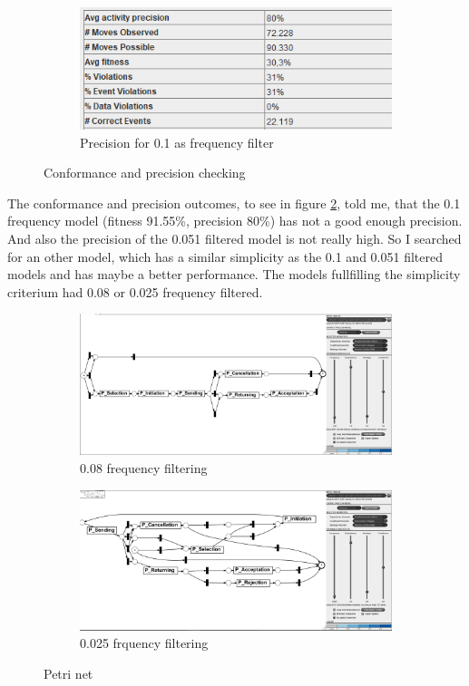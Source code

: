 \begin{figure}[!htbp]
\begin{subfigure}{.4\textwidth}
\end{subfigure}%
\begin{subfigure}{.4\textwidth}
  \centering
  \includegraphics[width=\linewidth]{P_Precision0-1.PNG}
  \caption{Precision for 0.1 as frequency filter}
  \label{fig:P_Prec0-1}
\end{subfigure}
\caption{Conformance and precision checking}
\label{fig:P_ConfPrec}
\end{figure}


The conformance and precision outcomes, to see in figure \ref{fig:P_ConfPrec}, told me, that the 0.1 frequency model (fitness 91.55\%, precision 80\%) has not a good enough precision. And also the precision of the 0.051 filtered model is not really high. So I searched for an other model, which has a similar simplicity as the 0.1 and 0.051 filtered models and has maybe a better performance. The models fullfilling the simplicity criterium had 0.08 or 0.025 frequency filtered.

\begin{figure}[!htbp]
\centering
\begin{subfigure}{0.49\textwidth}
  \centering
  \includegraphics[width=0.8\linewidth]{P_DirectlyFollowedFreq0-08.PNG}
  \caption{0.08 frequency filtering}
  \label{fig:P_0-08}
\end{subfigure}
\begin{subfigure}{0.49\textwidth}
  \centering
  \includegraphics[width=0.8\linewidth]{P_DirectlyFollowedFreq0-025.PNG}
  \caption{0.025 frquency filtering}
  \label{fig:P_0-025}
\end{subfigure}
\caption{Petri net}
\label{fig:P_Direct2Petri}
\end{figure}


